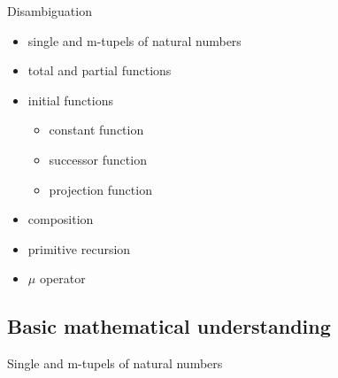 \documentclass[]{beamer}
\begin{document}
\begin{frame}{Disambiguation}
\begin{itemize}
\item{single and m-tupels of natural numbers}
\item{total and partial functions}
\item{initial functions}
	\begin{itemize}
	\item{constant function}
	\item{successor function}
	\item{projection function}
	\end{itemize}
\item{composition}
\item{primitive recursion}
\item{$\mu$ operator}
\end{itemize}
\end{frame}

\subsection{Basic mathematical understanding}


\begin{frame}{Single and m-tupels of natural numbers}
\begin{LARGE}
\end{LARGE}
\end{frame}
\end{document}
